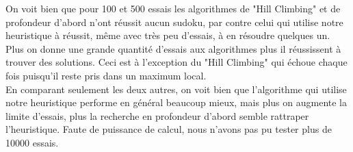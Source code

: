 \documentclass[a4paper,10pt]{article}
\begin{document}
On voit bien que pour 100 et 500 essais les algorithmes de "Hill Climbing" et de profondeur d'abord n'ont réussit aucun sudoku, par contre celui qui utilise notre heuristique à réussit, même avec très peu d'essais, à en résoudre quelques un. Plus on donne une grande quantité d'essais aux algorithmes plus il réussissent à trouver des solutions. Ceci est à l'exception du "Hill Climbing" qui échoue chaque fois puisqu'il reste pris dans un maximum local.\\

En comparant seulement les deux autres, on voit bien que l'algorithme qui utilise notre heuristique performe en général beaucoup mieux, mais plus on augmente la limite d'essais, plus la recherche en profondeur d'abord semble rattraper l'heuristique. Faute de puissance de calcul, nous n'avons pas pu tester plus de 10000 essais. 
\end{document}
